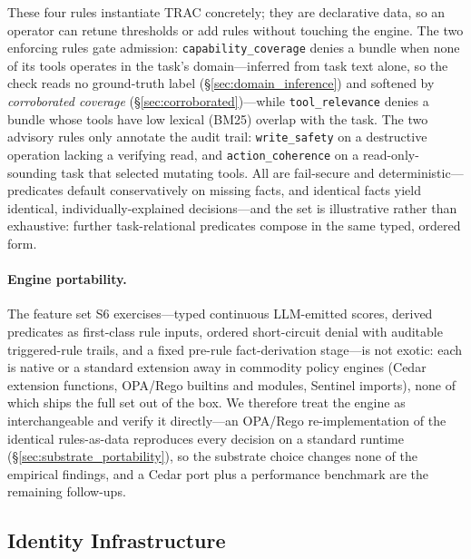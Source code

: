 \documentclass[sigconf,review,anonymous]{acmart}
\begin{document}
These four rules instantiate TRAC concretely; they are declarative data, so an operator can retune thresholds or add rules without touching the engine. The two enforcing rules gate admission: \texttt{capability\_coverage} denies a bundle when none of its tools operates in the task's domain---inferred from task text alone, so the check reads no ground-truth label (\S\ref{sec:domain_inference}) and softened by \emph{corroborated coverage} (\S\ref{sec:corroborated})---while \texttt{tool\_relevance} denies a bundle whose tools have low lexical (BM25) overlap with the task. The two advisory rules only annotate the audit trail: \texttt{write\_safety} on a destructive operation lacking a verifying read, and \texttt{action\_coherence} on a read-only-sounding task that selected mutating tools. All are fail-secure and deterministic---predicates default conservatively on missing facts, and identical facts yield identical, individually-explained decisions---and the set is illustrative rather than exhaustive: further task-relational predicates compose in the same typed, ordered form.

\paragraph{Engine portability.} The feature set S6 exercises---typed continuous LLM-emitted scores, derived predicates as first-class rule inputs, ordered short-circuit denial with auditable triggered-rule trails, and a fixed pre-rule fact-derivation stage---is not exotic: each is native or a standard extension away in commodity policy engines (Cedar extension functions, OPA/Rego builtins and modules, Sentinel imports), none of which ships the full set out of the box. We therefore treat the engine as interchangeable and verify it directly---an OPA/Rego re-implementation of the identical rules-as-data reproduces every decision on a standard runtime (\S\ref{sec:substrate_portability}), so the substrate choice changes none of the empirical findings, and a Cedar port plus a performance benchmark are the remaining follow-ups.

\subsection{Identity Infrastructure}
\label{sec:identity}
\end{document}
